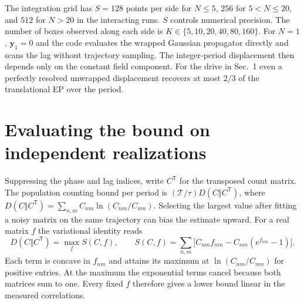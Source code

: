 \documentclass[11pt,letterpaper]{article}
\newcommand{\Tr}{\mathcal T}
\begin{document}
The integration grid has $S=128$ points per side for $N\le5$, $256$ for $5<N\le20$, and
$512$ for $N>20$ in the interacting runs. $S$ controls numerical precision. The number of
boxes observed along each side is $K\in\{5,10,20,40,80,160\}$. For $N=1$, $\mathbf y_1=0$ and
the code evaluates the wrapped Gaussian propagator directly and scans the lag without trajectory
sampling. The integer-period displacement then depends only on the constant field component.
For the drive in Sec.~1 even a perfectly resolved unwrapped displacement recovers at most $2/3$ of
the translational EP over the period.

\newpage
\section{Evaluating the bound on independent realizations}
Suppressing the phase and lag indices, write $C^{\mathsf T}$ for the transposed count matrix.
The population counting bound per period is $(\Tr/\tau)D(C\Vert C^{\mathsf T})$, where
$D(C\Vert C^{\mathsf T})=\sum_{n,m}C_{nm}\ln(C_{nm}/C_{mn})$.
Selecting the largest value after fitting a noisy matrix on the same trajectory can
bias the estimate upward. For a real matrix $f$ the variational identity reads
\begin{equation}
 D(C\Vert C^{\mathsf T})=\max_f S(C,f),\qquad S(C,f)=\sum_{n,m}\big[C_{nm}f_{nm}-C_{mn}(e^{f_{nm}}-1)\big].
\end{equation}
Each term is concave in $f_{nm}$ and attains its maximum at $\ln(C_{nm}/C_{mn})$ for
positive entries. At the maximum the exponential terms cancel because both matrices sum to one.
Every fixed $f$ therefore gives a lower bound linear in the measured correlations.
\end{document}
